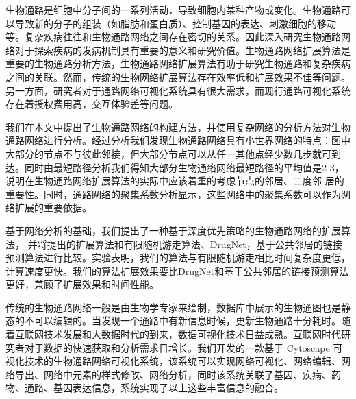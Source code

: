 \begin{conclusions}
生物通路是细胞中分子间的一系列活动，导致细胞内某种产物或变化。生物通路可以导致新的分子的组装（如脂肪和蛋白质）、控制基因的表达、刺激细胞的移动等。复杂疾病往往和生物通路网络之间存在密切的关系。因此深入研究生物通路网络对于探索疾病的发病机制具有重要的意义和研究价值。生物通路网络扩展算法是重要的生物通路分析方法，生物通路网络扩展算法有助于研究生物通路和复杂疾病之间的关联。然而，传统的生物网络扩展算法存在效率低和扩展效果不佳等问题。另一方面，研究者对于通路网络可视化系统具有很大需求，而现行通路可视化系统存在着授权费用高，交互体验差等问题。

我们在本文中提出了生物通路网络的构建方法，并使用复杂网络的分析方法对生物通路网络进行分析。经过分析我们发现生物通路网络具有小世界网络的特点：图中大部分的节点不与彼此邻接，但大部分节点可以从任一其他点经少数几步就可到达。同时由最短路径分析我们得知大部分生物通络网络最短路径的平均值是2-3，说明在生物通路网络扩展算法的实际中应该着重的考虑节点的邻居、二度邻
居的重要性。同时，通路网络的聚集系数分析显示，这些网络中的聚集系数可以作为网络扩展的重要依据。

基于网络分析的基础，我们提出了一种基于深度优先策略的生物通路网络的扩展算法， 并将提出的扩展算法和有限随机游走算法、DrugNet，基于公共邻居的链接预测算法进行比较。实验表明，我们的算法与有限随机游走相比时间复杂度更低，计算速度更快。我们的算法扩展效果要比DrugNet和基于公共邻居的链接预测算法更好，兼顾了扩展效果和时间性能。

传统的生物通路网络一般是由生物学专家来绘制，数据库中展示的生物通图也是静态的不可以编辑的。当发现一个通路中有新信息时候，更新生物通路十分耗时。随着互联网技术发展和大数据时代的到来，数据可视化技术日益成熟。互联网时代研究者对于数据的快速获取和分析需求日增长。我们开发的一款基于 Cytoscape 可视化技术的生物通路网络可视化系统，该系统可以实现网络可视化、网络编辑、网络导出、网络中元素的样式修改、网络分析，同时该系统关联了基因、疾病、药物、通路、基因表达信息，系统实现了以上这些丰富信息的融合。


\end{conclusions}

